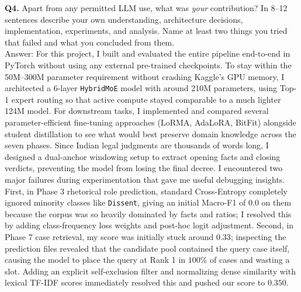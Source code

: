 \documentclass[11pt, oneside]{article}
\begin{document}
\noindent
\textbf{Q4.} Apart from any permitted LLM use, what was \emph{your} contribution? In 8--12 sentences describe your own understanding, architecture decisions, implementation, experiments, and analysis. Name at least two things you tried that failed and what you concluded from them. \\[0.4em]
Answer: For this project, I built and evaluated the entire pipeline end-to-end in PyTorch without using any external pre-trained checkpoints. To stay within the 50M--300M parameter requirement without crashing Kaggle's GPU memory, I architected a 6-layer \texttt{HybridMoE} model with around 210M parameters, using Top-1 expert routing so that active compute stayed comparable to a much lighter 124M model. For downstream tasks, I implemented and compared several parameter-efficient fine-tuning approaches (LoRMA, AdaLoRA, BitFit) alongside student distillation to see what would best preserve domain knowledge across the seven phases. Since Indian legal judgments are thousands of words long, I designed a dual-anchor windowing setup to extract opening facts and closing verdicts, preventing the model from losing the final decree. I encountered two major failures during experimentation that gave me useful debugging insights. First, in Phase 3 rhetorical role prediction, standard Cross-Entropy completely ignored minority classes like \texttt{Dissent}, giving an initial Macro-F1 of $0.0$ on them because the corpus was so heavily dominated by facts and ratios; I resolved this by adding class-frequency loss weights and post-hoc logit adjustment. Second, in Phase 7 case retrieval, my score was initially stuck around $0.33$; inspecting the prediction files revealed that the candidate pool contained the query case itself, causing the model to place the query at Rank 1 in $100\%$ of cases and wasting a slot. Adding an explicit self-exclusion filter and normalizing dense similarity with lexical TF-IDF scores immediately resolved this and pushed our score to $0.350$.

\medskip


\end{document}
